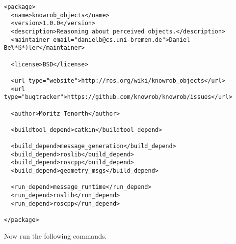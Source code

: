 \documentclass[main.tex]{subfiles}
\begin{document}
\begin{lstlisting}
<package>
  <name>knowrob_objects</name>
  <version>1.0.0</version>
  <description>Reasoning about perceived objects.</description>
  <maintainer email="danielb@cs.uni-bremen.de">Daniel Be%*ß*)ler</maintainer>

  <license>BSD</license>

  <url type="website">http://ros.org/wiki/knowrob_objects</url>
  <url type="bugtracker">https://github.com/knowrob/knowrob/issues</url>

  <author>Moritz Tenorth</author>

  <buildtool_depend>catkin</buildtool_depend>

  <build_depend>message_generation</build_depend>
  <build_depend>roslib</build_depend>
  <build_depend>roscpp</build_depend>
  <build_depend>geometry_msgs</build_depend>
  
  <run_depend>message_runtime</run_depend>
  <run_depend>roslib</run_depend>
  <run_depend>roscpp</run_depend>

</package>
\end{lstlisting}

Now run the following commands.	

\begin{mdframed}[backgroundcolor=mygray, rightline=false]

\end{mdframed}
	
	
\end{document}
